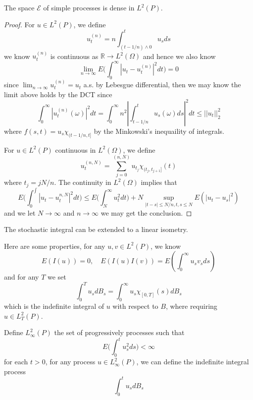 \documentclass[lang=en, color=blue, ]{elegantbook}
\newcommand{\R}{\mathbb{R}}
\begin{document}
\begin{proposition}
    The space $\mathcal{E}$ of simple processes is dense in $L^2(P)$.
\end{proposition}
\begin{proof}
    For $u \in L^2(P)$, we define
    \[
    u_t^{(n)} = n\int_{(t-1/n)\wedge 0}^t u_s ds
    \]
    we know $u_t^{(n)}$ is continuous as $\R \to L^2(\Omega)$ and hence we also know
    \[
    \lim_{n\to\infty}E\Big(\int_0^{\infty} |u_t - u_t^{(n)}|^2 dt\Big) = 0
    \]
    since $\lim_{n\to \infty} u_t^{(n)} = u_t$ a.s. by Lebesgue differential, then we may know the limit above holds by the DCT since
    \[
    \int_0^{\infty}|u_t^{(n)}(\omega)|^2 dt = \int_0^{\infty}n^2|\int_{t-1/n}^tu_s(\omega)ds|^2 dt \leq ||u_t||_2^2
    \]
    where $f(s,t) = u_s\chi_{(t-1/n,t]}$ by the Minkowski's inequaility of integrals.\par
    For $u\in L^2(P)$ continuous in $L^2(\Omega)$, we define
    \[
    u_t^{(n,N)} = \sum\limits_{j=0}^{(n,N)}u_{t_j}\chi_{(t_j,t_{j+1}]}(t)
    \]
    where $t_j = jN/n$. The continuity in $L^2(\Omega)$ implies that
    \[
    E\Big(\int_0^{\int}|u_t-u_t^{n,N}|^2 dt\Big) \leq E\Big(\int_N^{\infty} u_t^2 dt\Big) + N\sup_{|t-s| \leq N/n, t,s \leq N}E(|u_t-u_s|^2)
    \]
    and we let $N\to\infty$ and $n\to\infty$ we may get the conclusion.
\end{proof}

\begin{proposition}
    The stochastic integral can be extended to a linear isometry.
\end{proposition}

\begin{proposition}
    Here are some properties, for any $u,v\in L^2(P)$, we know
    \[
    E(I(u)) = 0,\quad E(I(u)I(v)) = E(\int_0^{\infty} u_sv_s ds)
    \]
    and for any $T$ we set
    \[
    \int_0^T u_s dB_s = \int_0^{\infty} u_s\chi_{[0,T]}(s)dB_s
    \]
    which is the indefinite integral of $u$ with respect to $B$, where requiring $u\in L^2_T(P)$.
\end{proposition}

\begin{definition}
    Define $L^2_{\infty}(P)$ the set of progressively processes such that
    \[
    E\Big(\int_0^t u_s^2 ds\Big) < \infty
    \]
    for each $t>0$, for any process $u\in L^2_{\infty}(P)$, we can define the indefinite integral process
    \[
    \int_0^t u_s dB_s
    \]
\end{definition}
\end{document}

